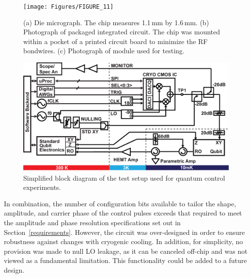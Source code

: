 \documentclass[journal]{IEEEtran}
\newcommand{\CR}[1]{{\color{black}#1}}
\begin{document}
\begin{figure}[bt!]\begin{center}
\CR{\texttt{[image: Figures/FIGURE\_11]}}
\end{center}
\caption{(a) Die micrograph. The chip measures 1.1\,mm by 1.6\,mm. (b) Photograph of packaged integrated circuit. The chip was mounted within a pocket of a printed circuit board to minimize the RF bondwires. (c) Photograph of module used for testing.}\label{diephoto}
\end{figure}

\begin{figure}[bt!]\begin{center}
\includegraphics[width=1.5\columnwidth]{Figures/FIGURE_12}
\caption{Simplified block diagram of the test setup used for quantum control experiments.}\label{setup}\end{center}
\end{figure}

In combination, the number of configuration bits available to tailor the shape\CR{,  amplitude, and carrier phase} of the control pulses exceeds that required to meet the amplitude and phase resolution specifications set out in Section~\ref{requirements}. However, the circuit was over-designed in order to ensure robustness against changes with cryogenic cooling. %
In addition, for
simplicity, no provision was made to null LO leakage, as it can be canceled off-chip
and was not viewed as a fundamental limitation. This functionality could be
added to a future design.
\end{document}
